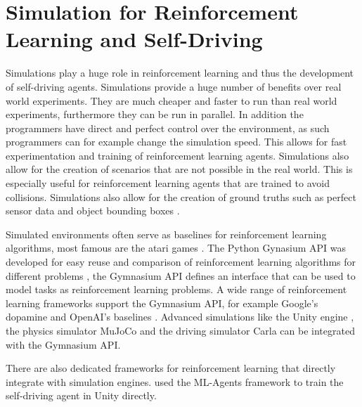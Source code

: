 \section{Simulation for Reinforcement Learning and Self-Driving}


Simulations play a huge role in reinforcement learning and thus the development of self-driving agents. Simulations provide a huge number of benefits over real world experiments. They are much cheaper and faster to run than real world experiments, furthermore they can be run in parallel. In addition the programmers have direct and perfect control over the environment, as such programmers can for example change the simulation speed. This allows for fast experimentation and training of reinforcement learning agents. Simulations also allow for the creation of scenarios that are not possible in the real world. This is especially useful for reinforcement learning agents that are trained to avoid collisions. Simulations also allow for the creation of ground truths such as perfect sensor data and object bounding boxes \autocite{carla}.

Simulated environments often serve as baselines for reinforcement learning algorithms, most famous are the atari games \autocite{atari}. The Python Gynasium API was developed for easy reuse and comparison of reinforcement learning algorithms for different problems \autocite{gymnasium}, the Gymnasium API defines an interface that can be used to model tasks as reinforcement learning problems. A wide range of reinforcement learning frameworks support the Gymnasium API, for example Google's dopamine \autocite{dopamine} and OpenAI's baselines \autocite{sb3}. Advanced simulations like the Unity engine \autocite{unity}, the physics simulator MuJoCo \autocite{mujoco} and the driving simulator Carla \autocite{carla} can be integrated with the Gymnasium API.


There are also dedicated frameworks for reinforcement learning that directly integrate with simulation engines. \autocite{maximilian} used the ML-Agents framework \autocite{mlagents} to train the self-driving agent in Unity directly.

